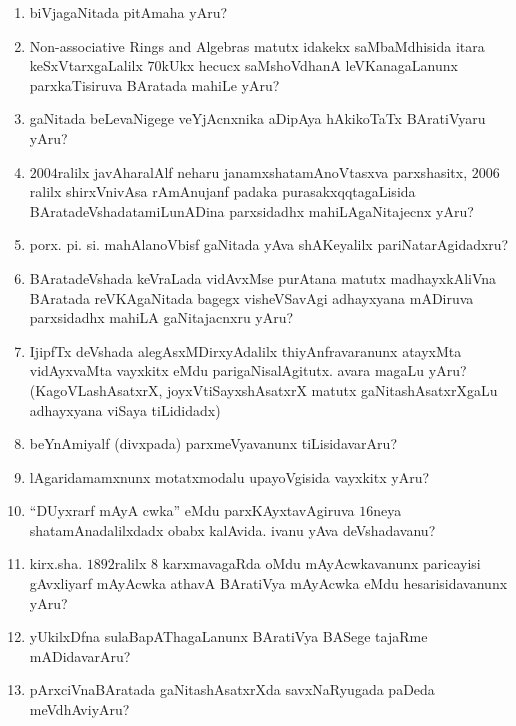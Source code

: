 \begin{enumerate}
\item biVjagaNitada pitAmaha yAru?
  
\item {\rm Non-associative Rings and Algebras} matutx idakekx saMbaMdhisida itara keSxVtarxgaLalilx $70$kUkx hecucx saMshoVdhanA leVKanagaLanunx  parxkaTisiruva BAratada mahiLe yAru?
  
\item gaNitada beLevaNigege veYjAcnxnika aDipAya hAkikoTaTx BAratiVyaru yAru?
  
\item $2004$ralilx javAharalAlf neharu janamxshatamAnoVtasxva parxshasitx, $2006$ralilx shirxVnivAsa rAmAnujanf padaka purasakxqqtagaLisida BAratadeVshada\break tamiLunADina parxsidadhx mahiLAgaNitajecnx yAru?

\item porx. pi. si. mahAlanoVbisf gaNitada yAva shAKeyalilx pariNatarAgidadxru?
  
\item BAratadeVshada keVraLada vidAvxMse purAtana matutx madhayxkAliVna BAratada reVKAgaNitada bagegx visheVSavAgi adhayxyana mADiruva parxsidadhx mahiLA gaNitajacnxru yAru?
  
\item IjipfTx deVshada alegAsxMDirxyAdalilx thiyAnfravaranunx atayxMta vidAyxvaMta vayxkitx eMdu parigaNisalAgitutx. avara magaLu yAru? (KagoVLashAsatxrX, joyxVtiSayxshAsatxrX matutx gaNitashAsatxrXgaLu adhayxyana viSaya tiLididadx)
  
\item beYnAmiyalf (divxpada) parxmeVyavanunx tiLisidavarAru?
  
\item lAgaridamamxnunx motatxmodalu upayoVgisida vayxkitx yAru?
  
\item ``DUyxrarf mAyA cwka'' eMdu parxKAyxtavAgiruva $16$neya shatamAna\-dalilxdadx obabx kalAvida. ivanu yAva deVshadavanu?
  
\item kirx.sha. $1892$ralilx $8$ karxmavagaRda oMdu mAyAcwkavanunx paricayisi gAvxliyarf mAyAcwka athavA BAratiVya mAyAcwka eMdu hesarisidavanunx yAru?
 
\item yUkilxDfna sulaBapAThagaLanunx BAratiVya BASege tajaRme mADi\-davarAru?

\item pArxciVnaBAratada gaNitashAsatxrXda savxNaRyugada paDeda meVdhAviyAru?
  

\end{enumerate}

